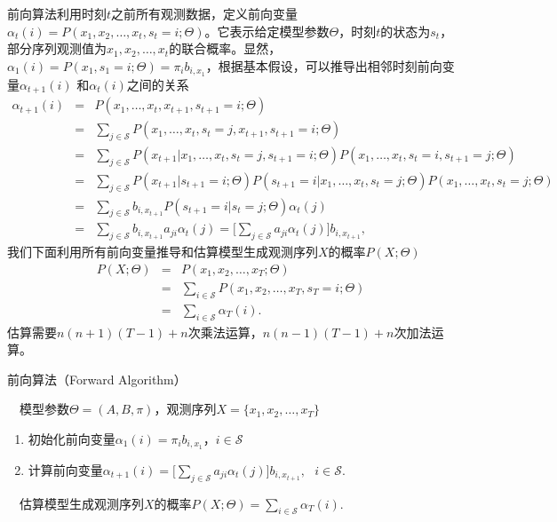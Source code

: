 前向算法利用时刻$t$之前所有观测数据，定义前向变量$\alpha_t(i)=P(x_1,x_2,\ldots,x_t, s_t=i;\Theta)$。它表示给定模型参数$\Theta$，时刻$t$的状态为$s_t$，部分序列观测值为$x_1,x_2,\ldots,x_t$的联合概率。显然，$\alpha_1(i)=P(x_1,s_1=i;\Theta)=\pi_i b_{i,x_1}$，根据基本假设，可以推导出相邻时刻前向变量$\alpha_{t+1}(i)$ 和$\alpha_t(i)$之间的关系
\begin{equation}
\begin{array}{lcl}
    \alpha_{t+1}(i) &=& P(x_1,\ldots,x_t,x_{t+1},s_{t+1} = i;\Theta)\\
    &=& \sum\limits_{j\in \mathcal S} P(x_1,\ldots,x_t,s_t=j,x_{t+1},s_{t+1} = i;\Theta)\\
    &=& \sum\limits_{j\in \mathcal S} P(x_{t+1}|x_1,\ldots,x_t,s_t=j,s_{t+1} = i; \Theta) P(x_1,\ldots,x_t,s_t=i,s_{t+1} = j; \Theta)\\
    &=& \sum\limits_{j\in \mathcal S} P(x_{t+1}|s_{t+1} = i; \Theta) P(s_{t+1} = i|x_1,\ldots,x_t,s_t=j;\Theta)P(x_1,\ldots,x_t,s_t=j; \Theta)\\
    &=& \sum\limits_{j\in \mathcal S} b_{i,x_{t+1}} P(s_{t+1} = i|s_t=j; \Theta) \alpha_t(j)\\
    &=& \sum\limits_{j\in \mathcal S} b_{i,x_{t+1}} a_{ji} \alpha_t(j) = \big[\sum\limits_{j\in \mathcal S} a_{ji} \alpha_t(j)\big]b_{i,x_{t+1}},
\end{array}
\end{equation}
我们下面利用所有前向变量推导和估算模型生成观测序列$X$的概率$P(X;\Theta)$
\begin{equation}
\begin{array}{lcl}
    P(X;\Theta)&=&P(x_1,x_2,\ldots,x_T;\Theta)\\
    &=&\sum\limits_{i\in \mathcal S} P(x_1,x_2,\ldots,x_T,s_T=i;\Theta)\\
    &=&\sum\limits_{i\in \mathcal S} \alpha_T(i).
\end{array}
\end{equation}
估算需要$n(n+1)(T-1)+n$次乘法运算，$n(n-1)(T-1)+n$次加法运算。

\begin{algorithm}[htbp]
\caption{前向算法（Forward Algorithm）}
\begin{algorithmic}
    \REQUIRE ~~模型参数$\Theta=(A,B,\pi)$，观测序列$X=\{x_1,x_2,\ldots,x_T\}$
    \begin{enumerate}[1.]
        \item 初始化前向变量$\alpha_1(i)=\pi_i b_{i,x_1}$，$i\in \mathcal S$
        \item 计算前向变量$\alpha_{t+1}(i)=\big[\sum\limits_{j\in \mathcal S} a_{ji} \alpha_t(j)\big]b_{i,x_{t+1}},~~~i\in \mathcal S.$
        \ENDFOR
    \end{enumerate}
    \ENSURE ~~估算模型生成观测序列$X$的概率$P(X;\Theta)=\sum\limits_{i\in \mathcal S} \alpha_T(i).$
\end{algorithmic}
\end{algorithm}

